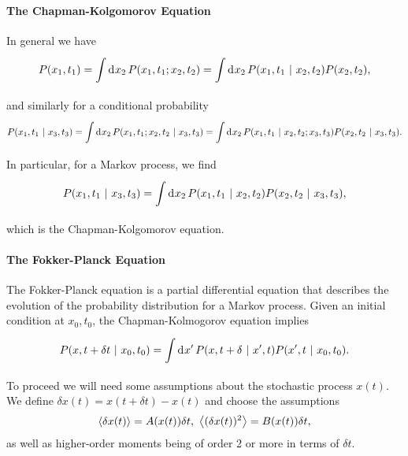 \paragraph{The Chapman-Kolgomorov Equation}
In general we have
\begin{align*}
	P(x_{1}, t_{1}) = \int\limits_{}^{}\dd[]{x_{2}}P(x_{1}, t_{1}; x_{2}, t_{2}) = \int\limits_{}^{}\dd[]{x_{2}}P(x_{1}, t_{1} \ | \  x_{2}, t_{2})P(x_{2}, t_{2}),
\end{align*}
and similarly for a conditional probability
\begin{align*}
	P(x_{1}, t_{1} \ | \  x_{3}, t_{3}) = \int\limits_{}^{}\dd[]{x_{2}}P(x_{1}, t_{1}; x_{2}, t_{2} \ | \  x_{3}, t_{3}) = \int\limits_{}^{}\dd[]{x_{2}}P(x_{1}, t_{1} \ | \  x_{2}, t_{2}; x_{3}, t_{3})P(x_{2}, t_{2} \ | \  x_{3}, t_{3}).
\end{align*}
In particular, for a Markov process, we find
\begin{align*}
	P(x_{1}, t_{1} \ | \  x_{3}, t_{3}) = \int\limits_{}^{}\dd[]{x_{2}}P(x_{1}, t_{1} \ | \  x_{2}, t_{2})P(x_{2}, t_{2} \ | \  x_{3}, t_{3}),
\end{align*}
which is the Chapman-Kolgomorov equation.

\paragraph{The Fokker-Planck Equation}
The Fokker-Planck equation is a partial differential equation that describes the evolution of the probability distribution for a Markov process. Given an initial condition at $x_{0}, t_{0}$, the Chapman-Kolmogorov equation implies
\begin{align*}
	P(x, t + \delta t \ | \  x_{0}, t_{0}) = \int\limits_{}^{}\dd[]{x\ensuremath{^{\prime}}}P(x, t + \delta \ | \  x^{\prime}, t)P(x^{\prime}, t \ | \  x_{0}, t_{0}).
\end{align*}
To proceed we will need some assumptions about the stochastic process $x(t)$. We define $\delta x(t) = x(t + \delta t) - x(t)$ and choose the assumptions
\begin{align*}
	\expval{\delta x(t)} = A(x(t))\delta t,\ \expval{(\delta x(t))^{2}} = B(x(t))\delta t,
\end{align*}
as well as higher-order moments being of order 2 or more in terms of $\delta t$.

